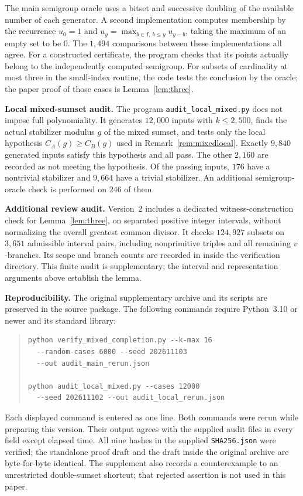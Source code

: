 \documentclass[11pt,a4paper]{article}
\numberwithin{equation}{section}
\theoremstyle{remark}
\newcommand{\code}[1]{\texttt{\small #1}}
\begin{document}
The main semigroup oracle uses a bitset and successive doubling of the
available number of each generator.
A second implementation computes membership by the recurrence
$u_0=1$ and
$u_y=\max_{b\in I,\ b\le y}u_{y-b}$, taking the maximum of an empty
set to be $0$. The $1{,}494$ comparisons between these implementations
all agree.
For a constructed certificate, the program checks that its points
actually belong to the independently computed semigroup.
For subsets of cardinality at most three in the small-index routine,
the code tests the conclusion by the oracle; the paper proof of those
cases is Lemma~\ref{lem:three}.

\textbf{Local mixed-sumset audit.}
The program \code{audit\_local\_mixed.py} does not impose full
polynomiality. It generates $12{,}000$ inputs with $k\le2{,}500$,
finds the actual stabilizer modulus $g$ of the mixed sumset, and tests
only the local hypothesis $C_A(g)\ge C_B(g)$ used in
Remark~\ref{rem:mixedlocal}.
Exactly $9{,}840$ generated inputs satisfy this hypothesis and all pass.
The other $2{,}160$ are recorded as not meeting the hypothesis.
Of the passing inputs, $176$ have a nontrivial stabilizer and
$9{,}664$ have a trivial stabilizer.
An additional semigroup-oracle check is performed on $246$ of them.

\newpage
\textbf{Additional review audit.}
Version~2 includes a dedicated witness-construction check for
Lemma~\ref{lem:three}, on separated positive integer intervals, without
normalizing the overall greatest common divisor. It checks $124{,}927$
subsets on $3{,}651$ admissible interval pairs, including nonprimitive
triples and all remaining $v$-branches. Its scope and branch counts
are recorded in  inside the
verification directory. This finite audit is supplementary; the interval
and representation arguments above establish the lemma.

\textbf{Reproducibility.}
The original supplementary archive and its scripts are preserved in
the source package. The following commands require Python~3.10 or
newer and its standard library:
\begin{quote}
\small
\begin{verbatim}
python verify_mixed_completion.py --k-max 16
  --random-cases 6000 --seed 202611103
  --out audit_main_rerun.json

python audit_local_mixed.py --cases 12000
  --seed 202611102 --out audit_local_rerun.json
\end{verbatim}
\end{quote}
Each displayed command is entered as one line.
Both commands were rerun while preparing this version.
Their output agrees with the supplied audit files in every field
except elapsed time.
All nine hashes in the supplied \code{SHA256.json} were verified;
the standalone proof draft and the draft inside the original archive
are byte-for-byte identical.
The supplement also records a counterexample to an unrestricted
double-sumset shortcut; that rejected assertion is not used in this paper.
\end{document}
